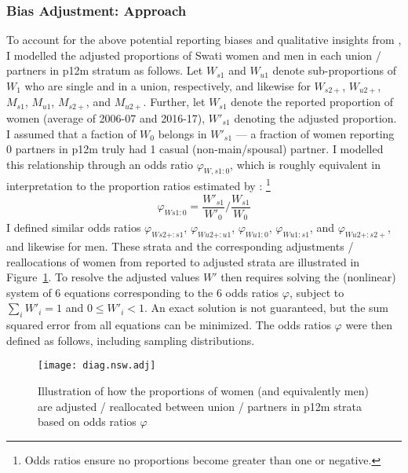 \subsubsection{Bias Adjustment: Approach}\label{model.par.nsw.bias}
To account for the above potential reporting biases
and qualitative insights from \cite{Ruark2014,Fielding-Miller2016,Ruark2019,Pulerwitz2021},
I modelled the adjusted proportions of Swati women and men
in each union / partners in p12m stratum as follows.
Let $W_{s1}$ and $W_{u1}$ denote sub-proportions of $W_{1}$ who are single and in a union, respectively,
and likewise for $W_{s2+}$, $W_{u2+}$, $M_{s1}$, $M_{u1}$, $M_{s2+}$, and $M_{u2+}$.
Further, let $W_{s1}$ denote the reported proportion of women (average of 2006-07 and 2016-17),
\vs $W'_{s1}$ denoting the adjusted proportion.
I assumed that a faction of $W_{0}$ belongs in $W'_{s1}$
--- \ie a fraction of women reporting 0 partners in p12m truly had 1 casual (non-main/spousal) partner.
I modelled this relationship through an odds ratio $\varphi_{W,s1:0}$,
which is roughly equivalent in interpretation to
the proportion ratios estimated by \citet{Behanzin2013}:%
\footnote{Odds ratios ensure no proportions become greater than one or negative.}
\begin{equation}\label{eq:Cwp.or}
  \varphi_{Ws1:0} = \frac{W'_{s1}}{W'_{0}} \bigg/ \frac{W_{s1}}{W_{0}}
\end{equation}
I defined similar odds ratios $\varphi_{Ws2+:s1}$, $\varphi_{Wu2+:u1}$,
$\varphi_{Wu1:0}$, $\varphi_{Wu1:s1}$, and $\varphi_{Wu2+:s2+}$, and likewise for men.
These strata and the corresponding adjustments / reallocations of women
from reported to adjusted strata are illustrated in Figure~\ref{fig:model.nsw.adj}.
To resolve the adjusted values $W'$ then requires
solving the (nonlinear) system of 6 equations corresponding to the 6 odds ratios $\varphi$,
subject to $\sum_i W'_i = 1$ and $0 \le W'_i < 1$.
An exact solution is not guaranteed,
but the sum squared error from all equations can be minimized.
The odds ratios $\varphi$ were then defined as follows, including sampling distributions.
\begin{figure}
  \centering
  \texttt{[image: diag.nsw.adj]}
  \caption{Illustration of how the proportions of women (and equivalently men)
    are adjusted / reallocated between union / partners in p12m strata
    based on odds ratios $\varphi$}
  \label{fig:model.nsw.adj}
\end{figure}
